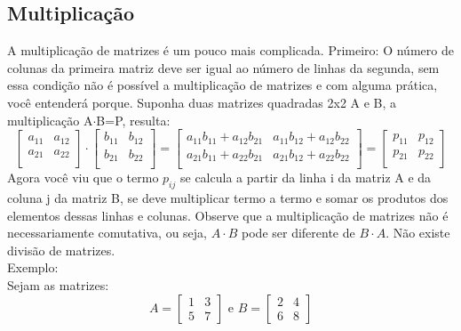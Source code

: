 \subsection{Multiplicação}
A multiplicação de matrizes é um pouco mais complicada. Primeiro: O número de colunas da primeira matriz deve ser igual ao número de linhas da segunda, sem essa condição não é possível a multiplicação de matrizes e com alguma prática, você entenderá porque. 
Suponha duas matrizes quadradas 2x2 A e B, a multiplicação A$\cdot$B=P, resulta: 
\begin{displaymath}
\begin{bmatrix}
  a_{11} & a_{12}\\ a_{21} & a_{22}\\
\end{bmatrix}
\cdot
\begin{bmatrix}
  b_{11} & b_{12}\\ b_{21} & b_{22}\\
  \end{bmatrix}
=
\begin{bmatrix}
  a_{11}b_{11}+a_{12}b_{21} & a_{11}b_{12}+a_{12}b_{22} \\
  a_{21}b_{11}+a_{22}b_{21} & a_{21}b_{12}+a_{22}b_{22} \\
\end{bmatrix}
 =
\begin{bmatrix}
   p_{11} & p_{12} \\ p_{21} & p_{22} \\
\end{bmatrix}
\end{displaymath}
Agora você viu que o termo $p_{ij}$ se calcula a partir da linha i da matriz A e da coluna j da matriz B, se deve multiplicar termo a termo e somar os produtos dos elementos dessas linhas e colunas. Observe que a multiplicação de matrizes não é necessariamente comutativa, ou seja, $A\cdot B$ pode ser diferente de $B\cdot A$. Não existe divisão de matrizes.\\
Exemplo:\\
Sejam as matrizes:
\begin{displaymath}
  A=
  \begin{bmatrix}
    1 & 3 \\ 5 & 7
  \end{bmatrix}
  \text{ e }
  B=
  \begin{bmatrix}
    2 & 4 \\ 6 & 8
  \end{bmatrix}
\end{displaymath}
